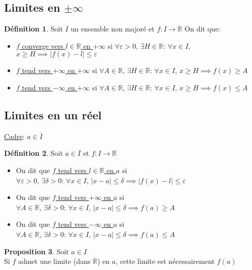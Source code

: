 \documentclass[10pt,a4paper]{article}
\theoremstyle{definition}
\newtheorem{proposition}{Proposition}[section]
\newtheorem{definition}[proposition]{Définition}
\begin{document}
\subsection{Limites en $\pm\infty$}
\begin{definition}
Soit $I$ un ensemble non majoré et $f: I \to \mathbb{R}$
On dit que:
\begin{itemize}
\item \uline{$f$ converge vers $l \in \mathbb{R}$ en $+\infty$} si $\forall \varepsilon > 0$, $\exists H \in \mathbb{R}$: $\forall x \in I$, $x \geq H \implies |f(x) - l| \leq \varepsilon$
\item \uline{$f$ tend vers $+\infty$ en $+\infty$} si $\forall A \in \mathbb{R}$, $\exists H \in \mathbb{R}$: $\forall x \in I$, $x \geq H \implies f(x) \geq A$
\item \uline{$f$ tend vers $-\infty$ en $+\infty$} si $\forall A \in \mathbb{R}$, $\exists H \in \mathbb{R}$: $\forall x \in I$, $x \geq H \implies f(x) \leq A$
\end{itemize}
\end{definition}

\subsection{Limites en un réel}
\uline{Cadre}: $a \in \overline{I}$
\begin{definition}
Soit $a \in \overline{I}$ et $f: I \to \mathbb{R}$
\begin{itemize}
\item On dit que \uline{$f$ tend vers $l \in \mathbb{R}$ en $a$} si \\
$\forall \varepsilon > 0$, $\exists \delta > 0$: $\forall x \in I$, $|x - a| \leq \delta \implies |f(x) - l| \leq \varepsilon$
\item On dit que \uline{$f$ tend vers $+\infty$ en $a$} si \\
$\forall A \in \mathbb{R}$, $\exists \delta > 0$: $\forall x \in I$, $|x - a| \leq \delta \implies f(a) \geq A$
\item On dit que \uline{$f$ tend vers $-\infty$ en $a$} si \\
$\forall A \in \mathbb{R}$, $\exists \delta > 0$: $\forall x \in I$, $|x - a| \leq \delta \implies f(a) \leq A$
\end{itemize}
\end{definition}
\begin{proposition}
Soit $a \in I$ \\
Si $f$ admet une limite (dans $\overline{\mathbb{R}}$) en $a$, cette limite est nécessairement $f(a)$
\end{proposition}
\end{document}
